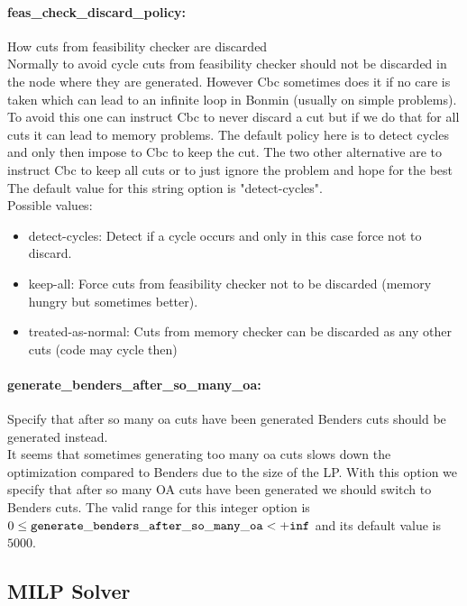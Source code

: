 \paragraph{feas\_check\_discard\_policy:}\label{opt:feas_check_discard_policy} How cuts from feasibility checker are discarded \\
 Normally to avoid cycle cuts from feasibility checker should not be discarded in the node where they are generated. However Cbc sometimes does it if no care is taken which can lead to an infinite loop in Bonmin (usually on simple problems). To avoid this one can instruct Cbc to never discard a cut but if we do that for all cuts it can lead to memory problems. The default policy here is to detect cycles and only then impose to Cbc to keep the cut. The two other alternative are to instruct Cbc to keep all cuts or to just ignore the problem and hope for the best The default value for this string option is "detect-cycles".
\\ 
Possible values:
\begin{itemize}
   \item detect-cycles: Detect if a cycle occurs and only in this case force not to discard.
   \item keep-all: Force cuts from feasibility checker not to be discarded (memory hungry but sometimes better).
   \item treated-as-normal: Cuts from memory checker can be discarded as any other cuts (code may cycle then)
\end{itemize}

\paragraph{generate\_benders\_after\_so\_many\_oa:}\label{opt:generate_benders_after_so_many_oa} Specify that after so many oa cuts have been generated Benders cuts should be generated instead. \\
 It seems that sometimes generating too many oa cuts slows down the optimization compared to Benders due to the size of the LP. With this option we specify that after so many OA cuts have been generated we should switch to Benders cuts. The valid range for this integer option is
$0 \le {\tt generate\_benders\_after\_so\_many\_oa } <  {\tt +inf}$
and its default value is $5000$.


\subsection{MILP Solver}
\label{sec:MILPSolver}
